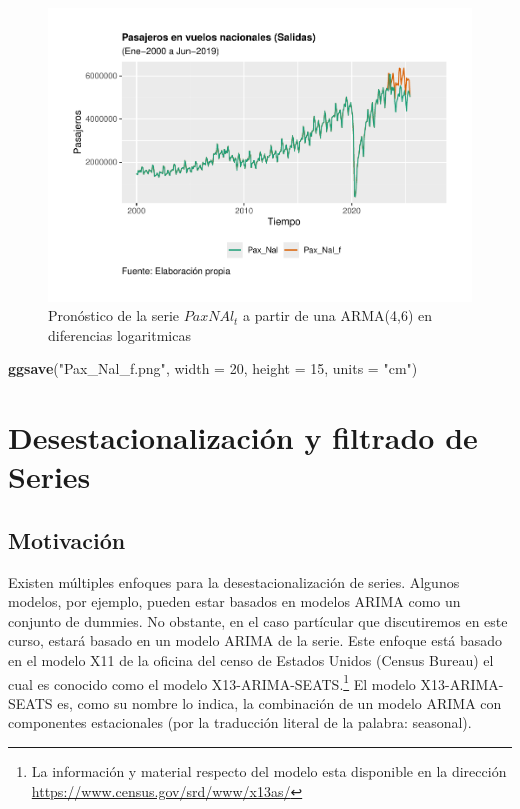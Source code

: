 \documentclass[
]{book}
\newenvironment{Shaded}{\begin{snugshade}}{\end{snugshade}}
\newcommand{\AttributeTok}[1]{\textcolor[rgb]{0.13,0.29,0.53}{#1}}
\newcommand{\DecValTok}[1]{\textcolor[rgb]{0.00,0.00,0.81}{#1}}
\newcommand{\FunctionTok}[1]{\textcolor[rgb]{0.13,0.29,0.53}{\textbf{#1}}}
\newcommand{\NormalTok}[1]{#1}
\newcommand{\StringTok}[1]{\textcolor[rgb]{0.31,0.60,0.02}{#1}}
\begin{document}
\begin{figure}

{\centering \includegraphics{Notas-Series-Tiempo_files/figure-latex/fig417-1} 

}

\caption{Pronóstico de la serie $PaxNAl_t$ a partir de una ARMA(4,6) en diferencias logaritmicas}\label{fig:fig417}
\end{figure}

\begin{Shaded}
\begin{Highlighting}[]
\FunctionTok{ggsave}\NormalTok{(}\StringTok{"Pax\_Nal\_f.png"}\NormalTok{, }\AttributeTok{width =} \DecValTok{20}\NormalTok{, }\AttributeTok{height =} \DecValTok{15}\NormalTok{, }\AttributeTok{units =} \StringTok{"cm"}\NormalTok{)}
\end{Highlighting}
\end{Shaded}

\hypertarget{desestacionalizaciuxf3n-y-filtrado-de-series}{%
\chapter{Desestacionalización y filtrado de Series}\label{desestacionalizaciuxf3n-y-filtrado-de-series}}

\hypertarget{motivaciuxf3n}{%
\section{Motivación}\label{motivaciuxf3n}}

Existen múltiples enfoques para la desestacionalización de series. Algunos modelos, por ejemplo, pueden estar basados en modelos ARIMA como un conjunto de dummies. No obstante, en el caso partícular que discutiremos en este curso, estará basado en un modelo ARIMA de la serie. Este enfoque está basado en el modelo X11 de la oficina del censo de Estados Unidos (Census Bureau) el cual es conocido como el modelo X13-ARIMA-SEATS.\footnote{ La información y material respecto del modelo esta disponible en la dirección \url{https://www.census.gov/srd/www/x13as/}} El modelo X13-ARIMA-SEATS es, como su nombre lo indica, la combinación de un modelo ARIMA con componentes estacionales (por la traducción literal de la palabra: seasonal).
\end{document}
